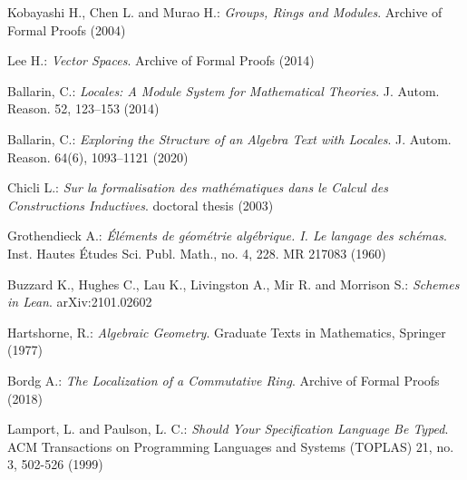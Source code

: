 \documentclass[12pt]{scrartcl}
\begin{document}
\begin{thebibliography}{}
	
	Kobayashi H., Chen L. and Murao H.:
	\newblock \textit{Groups, Rings and Modules}.
	\newblock Archive of Formal Proofs (2004)
	
	Lee H.:
	\newblock \textit{Vector Spaces}.
	\newblock Archive of Formal Proofs (2014)
	
	Ballarin, C.: 
	\newblock \textit{Locales: A Module System for Mathematical Theories}.
	\newblock J. Autom. Reason. 52, 123–153 (2014)
	
	Ballarin, C.:
	\newblock \textit{Exploring the Structure of an Algebra Text with Locales}. 
	\newblock J. Autom. Reason. 64(6), 1093–1121 (2020)
	
	Chicli L.:
	\newblock \textit{Sur la formalisation des math\'ematiques dans le Calcul des Constructions Inductives}.
	\newblock doctoral thesis (2003)
	
	Grothendieck A.:
	\newblock \textit{\'El\'ements de g\'eom\'etrie alg\'ebrique. I. Le langage des sch\'emas}.
	\newblock Inst. Hautes \'Etudes Sci. Publ. Math., no. 4, 228. MR 217083 (1960)
	
	Buzzard K., Hughes C., Lau K., Livingston A., Mir R. and Morrison S.:
	\newblock \textit{Schemes in Lean}.
	\newblock arXiv:2101.02602
	
	Hartshorne, R.:
	\newblock \textit{Algebraic Geometry}.
	\newblock Graduate Texts in Mathematics, Springer (1977)
	
	Bordg A.:
	\newblock \textit{The Localization of a Commutative Ring}.
	\newblock Archive of Formal Proofs (2018)
	
	Lamport, L. and Paulson, L. C.:
	\newblock \textit{Should Your Specification Language Be Typed}.
	\newblock  ACM Transactions on Programming Languages and Systems (TOPLAS) 21, no. 3, 502-526 (1999)
	
\end{thebibliography}

					

		
\end{document}
